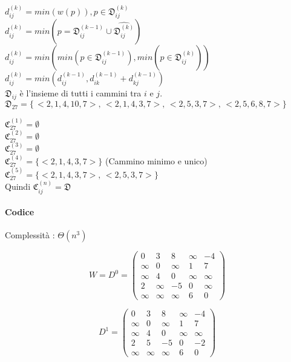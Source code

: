 $d_{ij}^{(k)} = min(w(p)), p \in \mathfrak{D}_{ij}^{(k)}$ \\
$d_{ij}^{(k)} = min(p=\mathfrak{D}_{ij}^{(k-1)} \cup \hat{\mathfrak{D}_{ij}^{(k)}} )$ \\
$d_{ij}^{(k)} = min(min(p \in \mathfrak{D}_{ij}^{(k-1)}), min(p \in \hat{\mathfrak{D}_{ij}^{(k)}} ))$ \\

$d_{ij}^{(k)} = min(d_{ij}^{(k-1)}, d_{ik}^{(k-1)} + d_{kj}^{(k-1)} )$ \\



$\mathfrak{D}_{ij}$ è l'insieme di tutti i cammini tra $i$ e $j$. \\
$\mathfrak{D}_{27} = \{\,<2,1,4,10,7>,\,<2,1,4,3,7>,\, <2,5,3,7>,\, <2,5,6,8,7>\}$

$\mathfrak{C}_{27}^{(1)} = \emptyset$ \\
$\mathfrak{C}_{27}^{(2)} = \emptyset$ \\
$\mathfrak{C}_{27}^{(3)} = \emptyset$ \\
$\mathfrak{C}_{27}^{(4)} = \{<2,1,4,3,7>\}$ (Cammino minimo e unico)\\
$\mathfrak{C}_{27}^{(5)} = \{<2,1,4,3,7>,\, <2,5,3,7>\}$ \\
Quindi $\mathfrak{C}_{ij}^{(n)} = \mathfrak{D}$ \\

\paragraph{Codice}


Complessità : $\Theta(n^3)$

\[
W = D^0 =
 \begin{pmatrix}
  0 & 3 & 8 & \infty & -4 \\
  \infty & 0 & \infty & 1 & 7 \\
  \infty & 4 & 0 & \infty & \infty \\
  2 & \infty & -5 & 0 & \infty \\
  \infty & \infty & \infty & 6 & 0
 \end{pmatrix}
\]

\[
D^1 =
 \begin{pmatrix}
  0 & 3 & 8 & \infty & -4 \\
  \infty & 0 & \infty & 1 & 7 \\
  \infty & 4 & 0 & \infty & \infty \\
  2 & 5 & -5 & 0 & -2 \\
  \infty & \infty & \infty & 6 & 0
 \end{pmatrix}
\]

